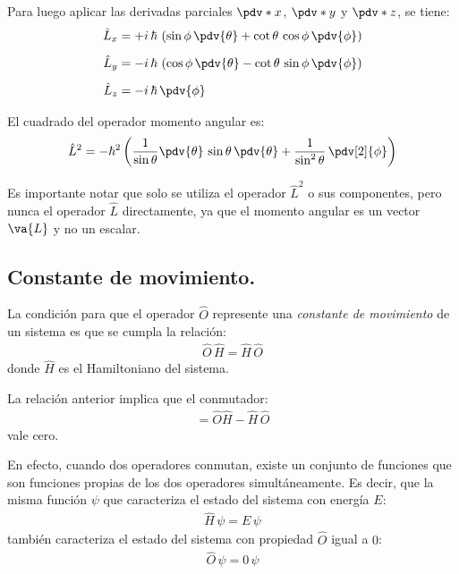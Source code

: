 Para luego aplicar las derivadas parciales $\pdv*{x}$, $\pdv*{y}$ y $\pdv*{z}$, se tiene:
\begin{align}
\begin{aligned}
\hat{L}_{x} &= + i\, \hbar \, \left( \sin \phi \,\pdv{\theta} + \cot \theta\, \cos \phi \, \pdv{\phi} \right) \\[0.5em] 
\hat{L}_{y} &= - i\, \hbar \, \left( \cos \phi \,\pdv{\theta} - \cot \theta\, \sin \phi \, \pdv{\phi} \right) \\[0.5em] 
\hat{L}_{z} &= - i\, \hbar \, \pdv{\phi}
\end{aligned}
\label{eq:ecuacion_01_04a}
\end{align}

El cuadrado del operador momento angular es:
\begin{align}
\hat{L}^{2} = - \hbar^{2} \left( \dfrac{1}{\sin \theta} \pdv{\theta} \, \sin \theta \, \pdv{\theta} + \dfrac{1}{\sin^{2} \theta} \, \pdv[2]{\phi} \right)
\label{eq:ecuacion_01_04b}
\end{align}

Es importante notar que solo se utiliza el operador $\hat{L}^{2}$ o sus componentes, pero nunca el operador $\hat{L}$ directamente, ya que el momento angular es un vector $\va{L}$ y no un escalar.

\subsection{Constante de movimiento.}

La condición para que el operador $\hat{O}$ represente una \emph{constante de movimiento} de un sistema es que se cumpla la relación:
\begin{align}
\hat{O} \, \hat{H} = \hat{H} \, \hat{O}
\label{eq:ecuacion_01_05}
\end{align}
donde $\hat{H}$ es el Hamiltoniano del sistema.
\par
La relación anterior implica que el conmutador:
\begin{align}
[\hat{O}, \hat{H}] = \hat{O} \hat{H} - \hat{H} \, \hat{O}
\label{eq:ecuacion_01_06}
\end{align}
vale cero.
\par
En efecto, cuando dos operadores conmutan, existe un conjunto de funciones que son funciones propias de los dos operadores simultáneamente. Es decir, que la misma función $\psi$ que caracteriza el estado del sistema con energía $E$:
\begin{align*}
\hat{H} \, \psi = E \, \psi
\end{align*}
también caracteriza el estado del sistema con propiedad $\hat{O}$ igual a $0$:
\begin{align*}
\hat{O} \, \psi = 0 \, \psi
\end{align*}

